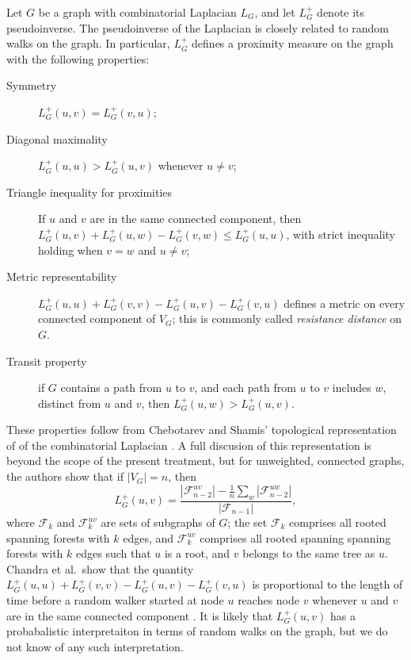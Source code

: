 \documentclass[12pt]{article}
\theoremstyle{plain}
\begin{document}
Let $G$ be a graph with combinatorial Laplacian $L_G$, and let
$L_G^+$ denote its pseudoinverse. The pseudoinverse of the Laplacian is closely
related to random walks on the graph.  In particular, 
$L_{G}^{+}$ defines a proximity measure on the graph with the
following properties:
\begin{description}
  \item[Symmetry]
    $L_G^{+}(u,v) = L_G^{+}(v,u)$;
 \item[Diagonal maximality]
    $L_G^{+}(u,u) > L_G^{+} (u,v)$ whenever $u \neq v$;
  \item[Triangle inequality for proximities]
    If $u$ and $v$ are in the same connected component, then
    $L_G^{+} (u,v) + L_G^{+} (u,w) - L_G^{+} (v,w) \leq L_G^{+} (u,u)$, with strict inequality
    holding when $v = w$ and $u \neq v$;
  \item[Metric representability]
   $L_G^{+} (u,u) + L_G^{+} (v,v) - L_G^{+} (u,v) - L_G^{+} (v,u)$
    defines a metric on every connected component of $V_G$;  this is commonly called
    \emph{resistance distance} on $G$.
 \item[Transit property]
    if $G$ contains a path from $u$ to $v$, and each path from $u$ to
    $v$ includes $w$, distinct from $u$ and $v$, then $L_G^{+}(u,w) >
    L_G^{+}(u,v)$.
\end{description}
These properties follow from Chebotarev and Shamis' topological
representation of of the combinatorial Laplacian
\cite{chebotarev1998proximity}.  A full discusion of this
representation is beyond the scope of the present treatment, but for
unweighted, connected graphs, the authors show that if $|V_G| = n$,
then
\[
  L_G^{+}(u,v) = \frac{|\mathcal{F}_{n-2}^{uv}| - \frac{1}{n}
    \sum_{w} |\mathcal{F}_{n-2}^{uw}|}{|\mathcal{F}_{n-1}|},
\]
where $\mathcal{F}_k$ and $\mathcal{F}_k^{uv}$ are sets of subgraphs
of $G$; the set $\mathcal{F}_{k}$ comprises all rooted spanning forests
with $k$ edges, and $\mathcal{F}_{k}^{uv}$ comprises all rooted spanning
spanning forests with $k$ edges such that $u$ is a root, and $v$
belongs to the same tree as $u$.  Chandra et al.\ show that the
quantity $L_G^{+} (u,u) + L_G^{+} (v,v) - L_G^{+} (u,v) - L_G^{+} (v,u)$ is
proportional to the length of time before a random walker started at
node $u$ reaches node $v$ whenever $u$ and $v$ are in the same
connected component \cite{chandra1989electrical}.  It is likely that $L_G^{+}(u,v)$ has a
probabalistic interpretaiton in terms of random walks on the graph,
but we do not know of any such interpretation.
\end{document}
